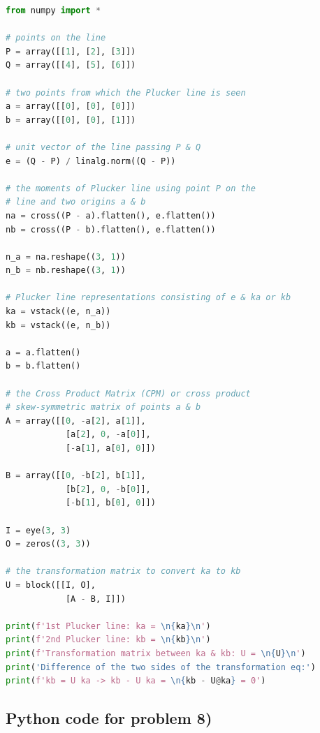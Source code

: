 \documentclass[conference]{IEEEtran}
\begin{document}
\begin{lstlisting}[language=Python]
from numpy import *

# points on the line
P = array([[1], [2], [3]])
Q = array([[4], [5], [6]])

# two points from which the Plucker line is seen
a = array([[0], [0], [0]])
b = array([[0], [0], [1]])

# unit vector of the line passing P & Q
e = (Q - P) / linalg.norm((Q - P))

# the moments of Plucker line using point P on the
# line and two origins a & b
na = cross((P - a).flatten(), e.flatten())
nb = cross((P - b).flatten(), e.flatten())

n_a = na.reshape((3, 1))
n_b = nb.reshape((3, 1))

# Plucker line representations consisting of e & ka or kb
ka = vstack((e, n_a))
kb = vstack((e, n_b))

a = a.flatten()
b = b.flatten()

# the Cross Product Matrix (CPM) or cross product
# skew-symmetric matrix of points a & b
A = array([[0, -a[2], a[1]],
            [a[2], 0, -a[0]],
            [-a[1], a[0], 0]])

B = array([[0, -b[2], b[1]],
            [b[2], 0, -b[0]],
            [-b[1], b[0], 0]])

I = eye(3, 3)
O = zeros((3, 3))

# the transformation matrix to convert ka to kb
U = block([[I, O],
            [A - B, I]])

print(f'1st Plucker line: ka = \n{ka}\n')
print(f'2nd Plucker line: kb = \n{kb}\n')
print(f'Transformation matrix between ka & kb: U = \n{U}\n')
print('Difference of the two sides of the transformation eq:')
print(f'kb = U ka -> kb - U ka = \n{kb - U@ka} = 0')    
\end{lstlisting}

\subsection{Python code for problem 8)}
\end{document}
